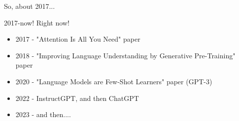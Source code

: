 \documentclass{beamer}
\begin{document}


\begin{frame}
	So, about 2017...
\end{frame}

\begin{frame}[plain]
\end{frame}


\begin{frame}{2017-now! Right now!}
	\begin{itemize}
		\item 2017 - "Attention Is All You Need" paper
		\pause
		\item 2018 - "Improving Language Understanding by Generative Pre-Training" paper
		\pause 
		\item 2020 - "Language Models are Few-Shot Learners" paper (GPT-3)
		\pause
		\item 2022 - InstructGPT, and then ChatGPT
		\pause
		\item 2023 - and then....
	\end{itemize}
\end{frame}
\end{document}
